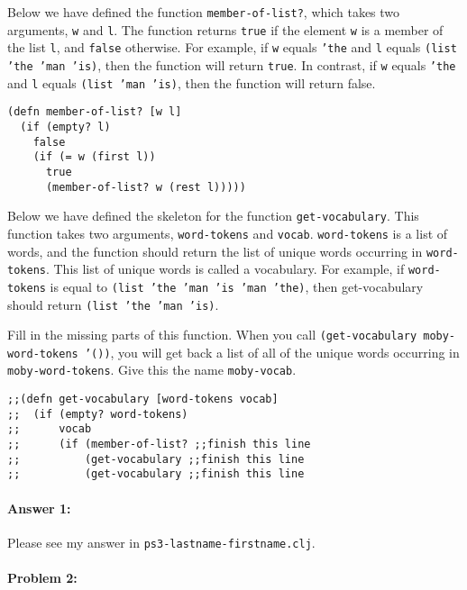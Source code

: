 \documentclass[10pt]{article}
\newcommand{\PSnum}{3}
\begin{document}
Below we have defined the function \texttt{member-of-list?}, which
takes two arguments, \texttt{w} and \texttt{l}. The function returns
\texttt{true} if the element \texttt{w} is a member of the list
\texttt{l}, and \texttt{false} otherwise. For example, if \texttt{w}
equals \texttt{'the} and \texttt{l} equals \texttt{(list 'the 'man
  'is)}, then the function will return \texttt{true}. In contrast, if
\texttt{w} equals \texttt{'the} and \texttt{l} equals \texttt{(list
  'man 'is)}, then the function will return false.

\begin{lstlisting}
(defn member-of-list? [w l]
  (if (empty? l)
    false
    (if (= w (first l))
      true
      (member-of-list? w (rest l)))))
\end{lstlisting}

Below we have defined the skeleton for the function
\texttt{get-vocabulary}. This function takes two arguments,
\texttt{word-tokens} and \texttt{vocab}. \texttt{word-tokens} is a
list of words, and the function should return the list of unique words
occurring in \texttt{word-tokens}. This list of unique words is called a
vocabulary. For example, if \texttt{word-tokens} is equal to 
\texttt{(list 'the 'man 'is 'man 'the)}, then get-vocabulary should 
return \texttt{(list 'the 'man 'is)}.

Fill in the missing parts of this function. When you call
\texttt{(get-vocabulary moby-word-tokens '())}, you will get back a
list of all of the unique words occurring in \texttt{moby-word-tokens}. Give
this the name \texttt{moby-vocab}.

\begin{lstlisting}
;;(defn get-vocabulary [word-tokens vocab]
;;  (if (empty? word-tokens)
;;      vocab
;;      (if (member-of-list? ;;finish this line
;;          (get-vocabulary ;;finish this line
;;          (get-vocabulary ;;finish this line
\end{lstlisting}

\paragraph{Answer 1:} Please see my answer in \texttt{ps\PSnum-lastname-firstname.clj}.

\noindent\hrulefill %

\paragraph{Problem 2:}
\end{document}
